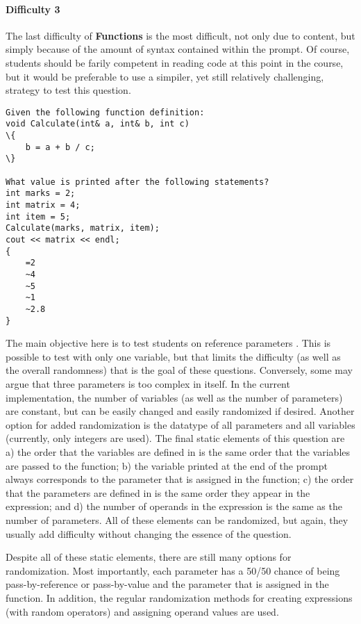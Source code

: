 \documentclass{article}
\begin{document}
\paragraph{Difficulty 3} \hfill \par

The last difficulty of \textbf{Functions} is the most difficult, not only due to content, but simply because of the amount of syntax contained within the prompt. Of course, students should be farily competent in reading code at this point in the course, but it would be preferable to use a simpiler, yet still relatively challenging, strategy to test this question.

\begin{lstlisting}[caption={\textbf{Functions} Difficulty 3 GIFT Example}, label=lst-functions_3, float]
Given the following function definition:
void Calculate(int& a, int& b, int c)
\{
	b = a + b / c;
\}

What value is printed after the following statements?
int marks = 2;
int matrix = 4;
int item = 5;
Calculate(marks, matrix, item);
cout << matrix << endl;
{
	=2
	~4
	~5
	~1
	~2.8
}
\end{lstlisting}


The main objective here is to test students on reference parameters . This is possible to test with only one variable, but that limits the difficulty (as well as the overall randomness) that is the goal of these questions. Conversely, some may argue that three parameters is too complex in itself. In the current implementation, the number of variables (as well as the number of parameters) are constant, but can be easily changed and easily randomized if desired. Another option for added randomization is the datatype of all parameters and all variables (currently, only integers are used). The final static elements of this question are a) the order that the variables are defined in is the same order that the variables are passed to the function; b) the variable printed at the end of the prompt always corresponds to the parameter that is assigned in the function; c) the order that the parameters are defined in is the same order they appear in the expression; and d) the number of operands in the expression is the same as the number of parameters. All of these elements can be randomized, but again, they usually add difficulty without changing the essence of the question. 

Despite all of these static elements, there are still many options for randomization.  Most importantly, each parameter has a 50/50 chance of being pass-by-reference or pass-by-value and the parameter that is assigned in the function. In addition, the regular randomization methods for creating expressions (with random operators) and assigning operand values are used.
\end{document}
